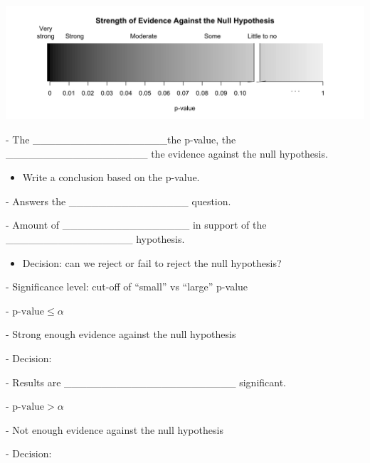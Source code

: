 \documentclass[
]{report}
\providecommand{\tightlist}{%
  \setlength{\itemsep}{0pt}\setlength{\parskip}{0pt}}
\newcommand{\rgi}{\hspace{24pt}}  %
\begin{document}
\begin{center}\includegraphics[width=0.9\linewidth]{images/soe_gradient_gray} \end{center}

\vspace{0.5mm}

\rgi \rgi - The \_\_\_\_\_\_\_\_\_\_\_\_\_\_\_\_\_\_the p-value, the \_\_\_\_\_\_\_\_\_\_\_\_\_\_\_\_\_\_\_ the evidence against the null hypothesis.

\begin{itemize}
\tightlist
\item
  Write a conclusion based on the p-value.
\end{itemize}

\rgi \rgi - Answers the \_\_\_\_\_\_\_\_\_\_\_\_\_\_\_\_ question.

\rgi \rgi - Amount of \_\_\_\_\_\_\_\_\_\_\_\_\_\_\_\_\_ in support of the \_\_\_\_\_\_\_\_\_\_\_\_\_\_\_\_\_ hypothesis.

\begin{itemize}
\tightlist
\item
  Decision: can we reject or fail to reject the null hypothesis?
\end{itemize}

\rgi - Significance level: cut-off of ``small'' vs ``large'' p-value

\rgi \rgi - \(\text{p-value} \le \alpha\)

\rgi \rgi \rgi - Strong enough evidence against the null hypothesis

\rgi \rgi \rgi - Decision:

\vspace{0.2in}

\rgi \rgi \rgi - Results are \_\_\_\_\_\_\_\_\_\_\_\_\_\_\_\_\_\_\_\_\_\_\_ significant.

\rgi \rgi - \(\text{p-value} > \alpha\)

\rgi \rgi \rgi - Not enough evidence against the null hypothesis

\rgi \rgi \rgi - Decision:

\vspace{0.2in}
\end{document}
